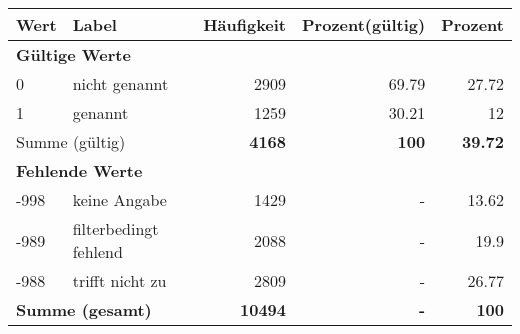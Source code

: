      \begin{longtable}{lXrrr}
     \toprule
     \textbf{Wert} & \textbf{Label} & \textbf{Häufigkeit} & \textbf{Prozent(gültig)} & \textbf{Prozent} \\
     \endhead
     \midrule
     \multicolumn{5}{l}{\textbf{Gültige Werte}}\\

     0 &
     \multicolumn{1}{X}{ nicht genannt   } &


       \num{2909} &
       \num[round-mode=places,round-precision=2]{69.79} &
         \num[round-mode=places,round-precision=2]{27.72} \\

     1 &
     \multicolumn{1}{X}{ genannt   } &


       \num{1259} &
       \num[round-mode=places,round-precision=2]{30.21} &
         \num[round-mode=places,round-precision=2]{12} \\
     \midrule
     \multicolumn{2}{l}{Summe (gültig)} &
       \textbf{\num{4168}} &
     \textbf{\num{100}} &
       \textbf{\num[round-mode=places,round-precision=2]{39.72}} \\
     \multicolumn{5}{l}{\textbf{Fehlende Werte}}\\
       -998 &
       keine Angabe &
         \num{1429} &
        - &
         \num[round-mode=places,round-precision=2]{13.62} \\
       -989 &
       filterbedingt fehlend &
         \num{2088} &
        - &
         \num[round-mode=places,round-precision=2]{19.9} \\
       -988 &
       trifft nicht zu &
         \num{2809} &
        - &
         \num[round-mode=places,round-precision=2]{26.77} \\
     \midrule
     \multicolumn{2}{l}{\textbf{Summe (gesamt)}} &
          \textbf{\num{10494}} &
        \textbf{-} &
        \textbf{\num{100}} \\
     \bottomrule
     \end{longtable}
     
